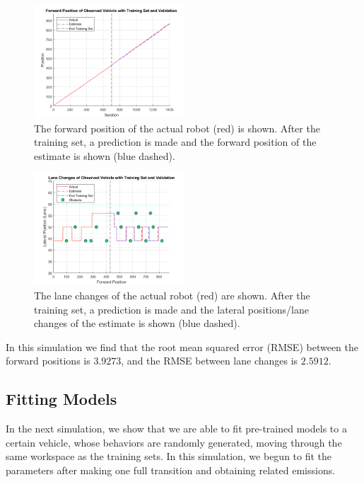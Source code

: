 \documentclass[conference]{IEEEtran}
\begin{document}
\begin{figure}[ht]
    \includegraphics[width=0.5\textwidth]{train1.png}
    \caption{The forward position of the actual robot (red) is shown. After the training set, a prediction is made and the forward position of the estimate is shown (blue dashed).}
    \label{fig:cs1}
\end{figure}

\begin{figure}[ht]
    \includegraphics[width=0.5\textwidth]{train2.png}
    \caption{The lane changes of the actual robot (red) are shown. After the training set, a prediction is made and the lateral positions/lane changes of the estimate is shown (blue dashed).}
    \label{fig:cs1b}
\end{figure}

In this simulation we find that the root mean squared error (RMSE) between the forward positions is $3.9273$, and the RMSE between lane changes is $2.5912$.  

\subsection{Fitting Models}

In the next simulation, we show that we are able to fit pre-trained models to a certain vehicle, whose behaviors are randomly generated, moving through the same workspace as the training sets. In this simulation, we begun to fit the parameters after making one full transition and obtaining related emissions. 
\end{document}
